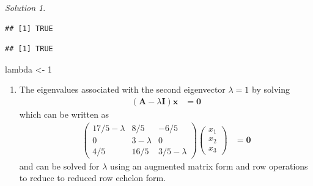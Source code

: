 \documentclass[
]{book}
\newenvironment{Shaded}{\begin{snugshade}}{\end{snugshade}}
\newcommand{\CommentTok}[1]{\textcolor[rgb]{0.56,0.35,0.01}{\textit{#1}}}
\newcommand{\DecValTok}[1]{\textcolor[rgb]{0.00,0.00,0.81}{#1}}
\newcommand{\KeywordTok}[1]{\textcolor[rgb]{0.13,0.29,0.53}{\textbf{#1}}}
\newcommand{\NormalTok}[1]{#1}
\newcommand{\OperatorTok}[1]{\textcolor[rgb]{0.81,0.36,0.00}{\textbf{#1}}}
\newcommand{\StringTok}[1]{\textcolor[rgb]{0.31,0.60,0.02}{#1}}
\providecommand{\tightlist}{%
  \setlength{\itemsep}{0pt}\setlength{\parskip}{0pt}}
\theoremstyle{definition}
\theoremstyle{definition}
\theoremstyle{definition}
\theoremstyle{definition}
\theoremstyle{remark}
\newtheorem*{solution}{Solution}
\begin{document}
\begin{solution}
\begin{verbatim}
## [1] TRUE
\end{verbatim}

\begin{Shaded}
\end{Shaded}

\begin{verbatim}
## [1] TRUE
\end{verbatim}

\begin{Shaded}
\begin{Highlighting}[]
\NormalTok{lambda <-}\StringTok{ }\DecValTok{1}
\end{Highlighting}
\end{Shaded}

\begin{enumerate}
\def\labelenumi{\alph{enumi})}
\setcounter{enumi}{1}
\tightlist
\item
  The eigenvalues associated with the second eigenvector \(\lambda = 1\) by solving
  \[
  \begin{aligned}
  \left( \mathbf{A} - \lambda \mathbf{I} \right) \mathbf{x} & = \mathbf{0}
  \end{aligned}
  \]
  which can be written as
  \[
  \begin{aligned}
  \begin{pmatrix} 
  17/5  - \lambda & 8/5 & -6/5 \\
  0 & 3 - \lambda & 0 \\
  4/5 & 16/5 & 3/5 - \lambda
  \end{pmatrix} \begin{pmatrix} x_1 \\ x_2 \\ x_3 \end{pmatrix} & = \mathbf{0}
  \end{aligned}
  \]
  and can be solved for \(\lambda\) using an augmented matrix form and row operations to reduce to reduced row echelon form.
\end{enumerate}


\end{solution}
\end{document}
